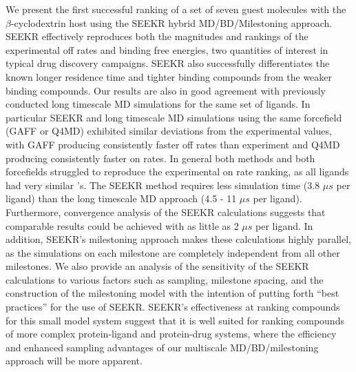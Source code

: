 

\par We present the first successful ranking of a set of seven guest molecules 
with the $\beta$-cyclodextrin host using the SEEKR hybrid MD/BD/Milestoning approach.
SEEKR effectively reproduces both the magnitudes and rankings of the 
experimental off rates\cite{Fukahori2004,Fukahori2006,Nishikawa2002,Nishikawa2006,Rekharsky1998,Barros1998} and binding free energies, two quantities of interest in 
typical drug discovery campaigns\cite{Lu2010a,Schuetz2017,Copeland2006b,Copeland2016}.
SEEKR also successfully differentiates the known longer residence time and 
tighter binding compounds from the weaker binding compounds. Our results are also in good agreement 
with previously conducted long timescale MD simulations for the same set of 
ligands\cite{Tang2017}. In particular SEEKR and long timescale MD simulations 
using the same forcefield (GAFF or Q4MD) exhibited similar deviations from the 
experimental values, with GAFF producing consistently faster off rates than 
experiment and Q4MD producing consistently faster on rates. In general both 
methods and both forcefields struggled to reproduce the experimental on rate 
ranking, as all ligands had very similar \kon's.
The SEEKR method requires less simulation time (3.8 ${\mu}s$ per ligand) 
than the long timescale MD approach (4.5 - 11 ${\mu}s$ per ligand). Furthermore, 
convergence analysis of the SEEKR calculations suggests that comparable results 
could be achieved with as little as 2 ${\mu}s$ per ligand. In addition, SEEKR's 
milestoning approach makes these calculations highly parallel, as the 
simulations on each milestone are completely independent from all other milestones.
We also provide an analysis of the sensitivity of the SEEKR 
calculations to various factors such as sampling, milestone spacing, and the 
construction of the milestoning model with the intention of putting forth 
``best practices'' for the use of SEEKR. SEEKR's effectiveness at ranking 
compounds for this small model system suggest that it is well suited for ranking 
compounds of more complex protein-ligand and protein-drug systems, where the 
efficiency and enhanced sampling advantages of our multiscale MD/BD/milestoning 
approach will be more apparent.
